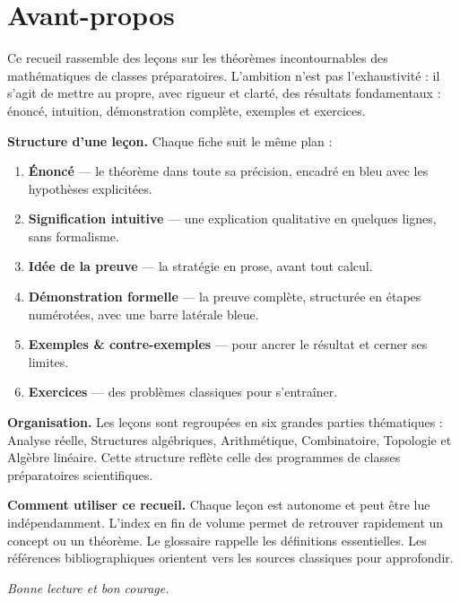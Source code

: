 
\chapter*{Avant-propos}
\thispagestyle{plain}

Ce recueil rassemble des leçons sur les théorèmes incontournables des
mathématiques de classes préparatoires. L'ambition
n'est pas l'exhaustivité : il s'agit de mettre au propre, avec rigueur et
clarté, des résultats fondamentaux :  énoncé, intuition, démonstration 
complète, exemples et exercices.

\medskip
\noindent\textbf{Structure d'une leçon.} Chaque fiche suit le même plan :
\begin{enumerate}
  \item \textbf{Énoncé} — le théorème dans toute sa précision, encadré en
        bleu avec les hypothèses explicitées.
  \item \textbf{Signification intuitive} — une explication qualitative en
        quelques lignes, sans formalisme.
  \item \textbf{Idée de la preuve} — la stratégie en prose, avant tout calcul.
  \item \textbf{Démonstration formelle} — la preuve complète, structurée
        en étapes numérotées, avec une barre latérale bleue.
  \item \textbf{Exemples \& contre-exemples} — pour ancrer le résultat et
        cerner ses limites.
  \item \textbf{Exercices} — des problèmes classiques pour s'entraîner.
\end{enumerate}

\medskip
\noindent\textbf{Organisation.} Les leçons sont regroupées en six grandes parties
thématiques : Analyse réelle, Structures algébriques, Arithmétique, Combinatoire,
Topologie et Algèbre linéaire. Cette structure reflète celle des programmes de
classes préparatoires scientifiques.

\medskip
\noindent\textbf{Comment utiliser ce recueil.} Chaque leçon est autonome
et peut être lue indépendamment. L'index en fin de volume permet de retrouver
rapidement un concept ou un théorème. Le glossaire rappelle les définitions
essentielles. Les références bibliographiques orientent vers les sources
classiques pour approfondir.

\vspace{1cm}
\begin{flushright}
  \textit{Bonne lecture et bon courage.}
\end{flushright}

\clearpage
